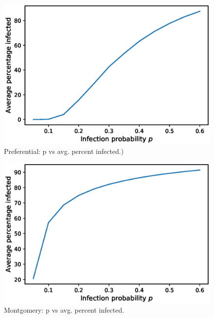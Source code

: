 \begin{figure}[!h]
    \centering
    \includegraphics[scale = 0.55]{Figuresnew/PA_attackrates.eps}
    \caption{Preferential: p vs avg. percent infected.)}
    \label{fig:PA_ar}
\end{figure}

\begin{figure}[!h]
    \centering
    \includegraphics[scale = 0.55]{Figuresnew/montgo_attackrates.eps}
    \caption{Montgomery: p vs avg. percent infected.}
    \label{fig:montgo_ar}
\end{figure}



